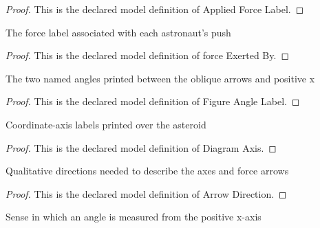 \begin{proof}
  This is the declared model definition of Applied Force Label.
\end{proof}
\begin{definition}
  \label{def:physics:phyx-mini-0755:phyxminiproblems-problemphyxmini0755-forceexertedby}
  The force label associated with each astronaut's push
\end{definition}
\begin{proof}
  This is the declared model definition of force Exerted By.
\end{proof}
\begin{definition}
  \label{def:physics:phyx-mini-0755:phyxminiproblems-problemphyxmini0755-figureanglelabel}
  The two named angles printed between the oblique arrows and positive x
\end{definition}
\begin{proof}
  This is the declared model definition of Figure Angle Label.
\end{proof}
\begin{definition}
  \label{def:physics:phyx-mini-0755:phyxminiproblems-problemphyxmini0755-diagramaxis}
  Coordinate-axis labels printed over the asteroid
\end{definition}
\begin{proof}
  This is the declared model definition of Diagram Axis.
\end{proof}
\begin{definition}
  \label{def:physics:phyx-mini-0755:phyxminiproblems-problemphyxmini0755-arrowdirection}
  Qualitative directions needed to describe the axes and force arrows
\end{definition}
\begin{proof}
  This is the declared model definition of Arrow Direction.
\end{proof}
\begin{definition}
  \label{def:physics:phyx-mini-0755:phyxminiproblems-problemphyxmini0755-rotationsense}
  Sense in which an angle is measured from the positive x-axis
\end{definition}
